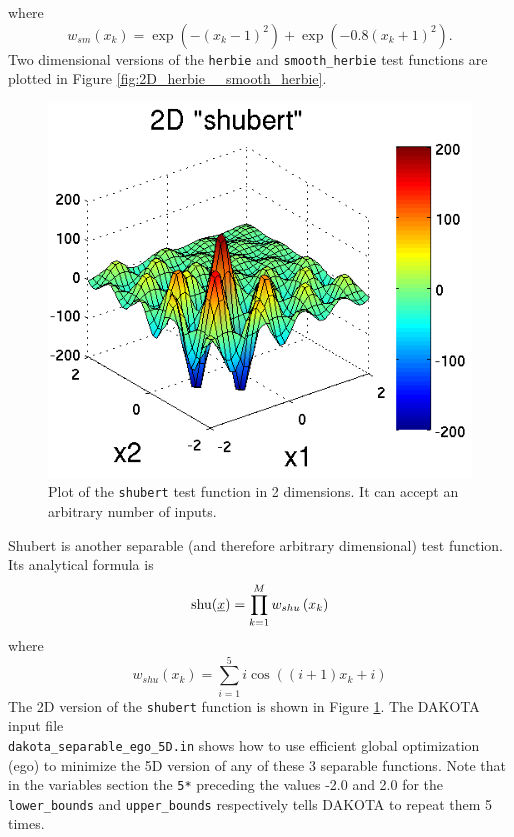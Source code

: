 where 
\begin{displaymath}
w_{sm}\left(x_k\right)=\exp(-(x_k-1)^2)+\exp(-0.8(x_k+1)^2).
\end{displaymath}
Two dimensional versions of the \texttt{herbie} and \texttt{smooth\_herbie} 
test functions are plotted in Figure \ref{fig:2D_herbie__smooth_herbie}.
\begin{figure}
\centering
\centerline{\includegraphics[scale=1.0]{images/DAK5pt2_2D_shubert}}
\caption{Plot of the \texttt{shubert} test function in 2 dimensions.  It can accept an arbitrary number of inputs.}
\label{fig:2D_shubert}
\end{figure}
Shubert is another separable (and therefore arbitrary dimensional) 
test function.  Its analytical formula is
\begin{displaymath}
{\rm shu}(\underline{x})=\prod_{k=1}^M w_{shu}\left(x_k\right)
\end{displaymath}
where 
\begin{displaymath}
w_{shu}\left(x_k\right)=\sum_{i=1}^5 i\cos((i+1)x_k+i)
\end{displaymath}
The 2D version of the \texttt{shubert} function is shown in 
Figure \ref{fig:2D_shubert}. The DAKOTA input file \\
\texttt{dakota\_separable\_ego\_5D.in} shows how
to use efficient global optimization (ego) to minimize the 5D version
of any of these 3 separable functions.  Note that in the variables 
section the \texttt{5*} preceding the values -2.0 and 2.0 for the
\texttt{lower\_bounds} and \texttt{upper\_bounds} respectively
tells DAKOTA to repeat them 5 times.
\begin{center}
  \begin{small}
    \begin{bigbox}
    \end{bigbox}
  \end{small}
\end{center}

